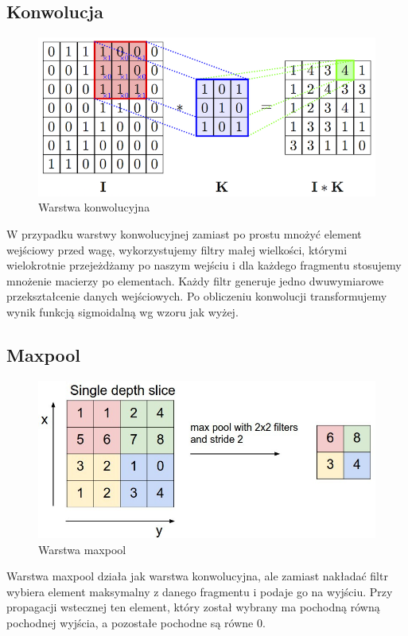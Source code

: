\documentclass{article}
\begin{document}
\subsection{Konwolucja}
\begin{figure}[H]
    \centering
    \includegraphics[width=\textwidth]{convolution.png}
    \caption{Warstwa konwolucyjna}
    \label{fig:mesh1}
\end{figure}
W przypadku warstwy konwolucyjnej zamiast po prostu mnożyć element wejściowy przed wagę, wykorzystujemy filtry małej wielkości, którymi wielokrotnie przejeżdżamy po naszym wejściu i dla każdego fragmentu stosujemy mnożenie macierzy po elementach. Każdy filtr generuje jedno dwuwymiarowe przekształcenie danych wejściowych. Po obliczeniu konwolucji transformujemy wynik funkcją sigmoidalną wg wzoru jak wyżej.

\subsection{Maxpool}
\begin{figure}[H]
    \centering
    \includegraphics[width=\textwidth]{maxpool.jpeg}
    \caption{Warstwa maxpool}
    \label{fig:mesh1}
\end{figure}
Warstwa maxpool działa jak warstwa konwolucyjna, ale zamiast nakładać filtr wybiera element maksymalny z danego fragmentu i podaje go na wyjściu. Przy propagacji wstecznej ten element, który został wybrany ma pochodną równą pochodnej wyjścia, a pozostałe pochodne są równe 0.
\end{document}
